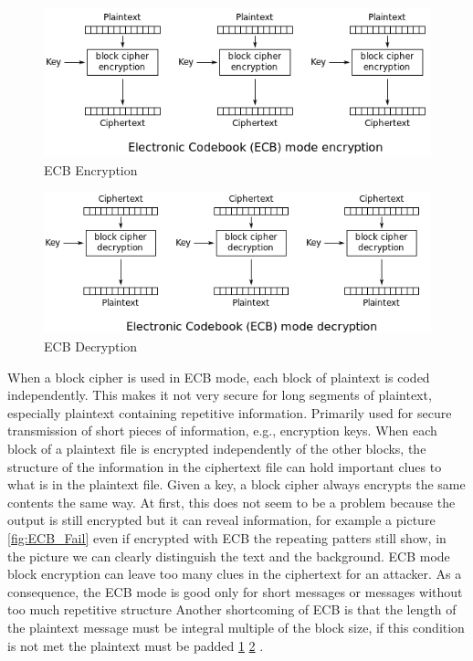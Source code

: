 \begin{figure}
	\centering
	\includegraphics[width=0.7\linewidth]{Images/Chapter3/ECB_Encryption}
	\caption{ECB Encryption}
	\label{fig:ECB_Encryption}
\end{figure}

\begin{figure}
	\centering
	\includegraphics[width=0.7\linewidth]{Images/Chapter3/ECB_Decryption}
	\caption{ECB Decryption}
	\label{fig:ECB_Decryption}
\end{figure}

When a block cipher is used in ECB mode, each block of plaintext is coded independently. This makes it not very secure for long segments of plaintext, especially plaintext containing repetitive information. Primarily used for secure transmission of short pieces of information, e.g., encryption keys. When each block of a plaintext file is encrypted independently of the other blocks, the structure of the information in the ciphertext file can hold important clues to what is in the plaintext file. Given a key, a block cipher always encrypts the same contents the same way. At first, this does not seem to be a problem because the output is still encrypted but it can reveal information, for example a picture \ref{fig:ECB_Fail} even if encrypted with ECB the repeating patters still show, in the picture we can clearly distinguish the text and the background. ECB mode block encryption can leave too many clues in the ciphertext for an attacker. As a consequence, the ECB mode is good only for short messages or messages without too much repetitive structure Another shortcoming of ECB is that the length of the plaintext message must be integral multiple of the block size, if this condition is not met the plaintext must be padded \ref{fig:ECB_Encryption} \ref{fig:ECB_Decryption} .

